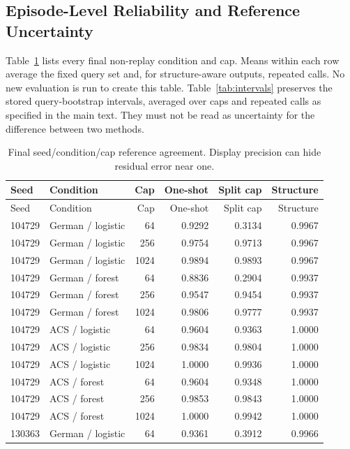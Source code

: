 \documentclass{article}
\begin{document}
\subsection{Episode-Level Reliability and Reference Uncertainty}
Table~\ref{tab:extended} lists every final non-replay condition and cap. Means within each row average the fixed query set and, for structure-aware outputs, repeated calls. No new evaluation is run to create this table. Table~\ref{tab:intervals} preserves the stored query-bootstrap intervals, averaged over caps and repeated calls as specified in the main text. They must not be read as uncertainty for the difference between two methods.

\begin{longtable}{llrrrr}
\caption{Final seed/condition/cap reference agreement. Display precision can hide residual error near one.}\label{tab:extended}\\
\toprule Seed & Condition & Cap & One-shot & Split cap & Structure\\\midrule
\endfirsthead
\toprule Seed & Condition & Cap & One-shot & Split cap & Structure\\\midrule
\endhead
104729 & German / logistic & 64 & 0.9292 & 0.3134 & 0.9967 \\
104729 & German / logistic & 256 & 0.9754 & 0.9713 & 0.9967 \\
104729 & German / logistic & 1024 & 0.9894 & 0.9893 & 0.9967 \\
104729 & German / forest & 64 & 0.8836 & 0.2904 & 0.9937 \\
104729 & German / forest & 256 & 0.9547 & 0.9454 & 0.9937 \\
104729 & German / forest & 1024 & 0.9806 & 0.9777 & 0.9937 \\
104729 & ACS / logistic & 64 & 0.9604 & 0.9363 & 1.0000 \\
104729 & ACS / logistic & 256 & 0.9834 & 0.9804 & 1.0000 \\
104729 & ACS / logistic & 1024 & 1.0000 & 0.9936 & 1.0000 \\
104729 & ACS / forest & 64 & 0.9604 & 0.9348 & 1.0000 \\
104729 & ACS / forest & 256 & 0.9853 & 0.9843 & 1.0000 \\
104729 & ACS / forest & 1024 & 1.0000 & 0.9942 & 1.0000 \\
130363 & German / logistic & 64 & 0.9361 & 0.3912 & 0.9966 \\

\end{longtable}
\end{document}
